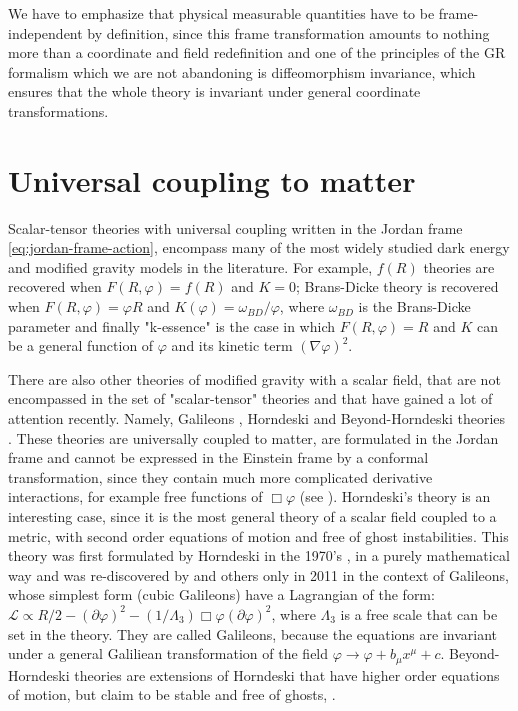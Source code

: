 We have to emphasize that physical measurable quantities have to be frame-independent by definition,
since this frame transformation amounts to nothing more than a coordinate and field redefinition 
and one of the principles of the GR formalism which we are not abandoning
is diffeomorphism invariance, which ensures that 
the whole theory is invariant under general coordinate transformations.


\section{Universal coupling to matter \label{sec:universal-coupling}}

Scalar-tensor theories with universal coupling written in the Jordan frame \cref{eq:jordan-frame-action}, 
encompass many of the most widely studied dark energy and modified gravity models in the literature. 
For example, $f(R)$ theories \cite{cite, many, f(R), theories} are recovered when $F(R,\varphi) = f(R)$ and $K=0$;
Brans-Dicke theory \cite{cite Brans Dicke, and, many, others} is recovered when $F(R,\varphi) = \varphi R $ and 
$K(\varphi) = \omega_{BD}/\varphi$, where $\omega_{BD}$ is the Brans-Dicke parameter and finally "k-essence" 
\cite{cite, Luca, and, some, kessence} is the case in which $F(R,\varphi) = R$ and $K$ can be a general
function of $\varphi$ and its kinetic term $(\nabla \varphi)^2$. 

There are also other theories of modified gravity with a scalar field, that are not encompassed in the set of "scalar-tensor"
theories and that have gained a lot of attention recently. Namely, Galileons \cite{cite}, Horndeski \cite{cite} 
and Beyond-Horndeski theories \cite{cite}. These theories are universally coupled to matter, are formulated
in the Jordan frame and cannot be expressed in the Einstein frame by a conformal transformation, since they contain much more complicated
derivative interactions, for example free functions of $\Box \varphi$ (see \cite{cite Zuma, Defayyet, Sawicki, Bellini}).
Horndeski's theory is an interesting case, since it is the most general theory of 
a scalar field coupled to a metric, with second order equations of motion and free of ghost instabilities. 
This theory was first formulated by Horndeski in the 1970's \cite{Horndeski}, in a purely mathematical way and was re-discovered by \cite{Defayett}
and others only in 2011 in the context of Galileons, whose simplest form (cubic Galileons) have a Lagrangian of the form:
$\mathcal{L} \propto R/2 - (\partial \varphi)^2 - (1/\Lambda_3)\Box \varphi (\partial \varphi)^2$, 
where $ \Lambda_3 $ is a free scale that can be set in the theory. They are called Galileons, 
because the equations are invariant under a general Galiliean transformation of the field $\varphi \rightarrow \varphi + b_\mu x^\mu +c$.
Beyond-Horndeski theories are extensions of Horndeski that have higher order equations of motion, but claim to be stable and free of ghosts,
\cite{cite Langlois, Gleyzes, Zuma}.

